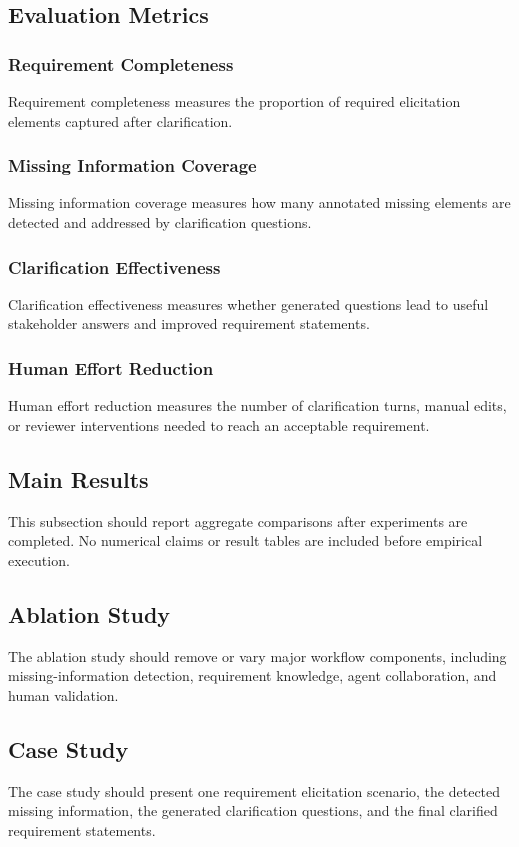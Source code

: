 \subsection{Evaluation Metrics}

\subsubsection{Requirement Completeness}
Requirement completeness measures the proportion of required elicitation elements captured after clarification.

\subsubsection{Missing Information Coverage}
Missing information coverage measures how many annotated missing elements are detected and addressed by clarification questions.

\subsubsection{Clarification Effectiveness}
Clarification effectiveness measures whether generated questions lead to useful stakeholder answers and improved requirement statements.

\subsubsection{Human Effort Reduction}
Human effort reduction measures the number of clarification turns, manual edits, or reviewer interventions needed to reach an acceptable requirement.

\subsection{Main Results}
This subsection should report aggregate comparisons after experiments are completed.
No numerical claims or result tables are included before empirical execution.

\subsection{Ablation Study}
The ablation study should remove or vary major workflow components, including missing-information detection, requirement knowledge, agent collaboration, and human validation.

\subsection{Case Study}
The case study should present one requirement elicitation scenario, the detected missing information, the generated clarification questions, and the final clarified requirement statements.
